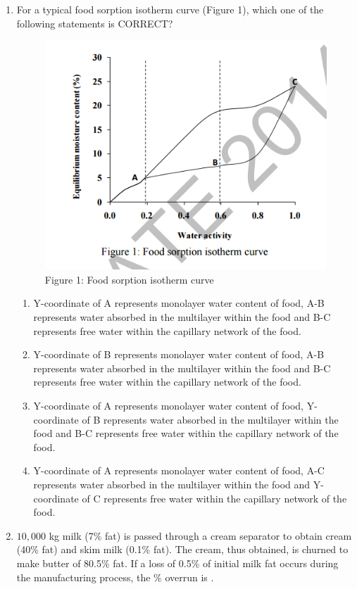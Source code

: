 \documentclass[a4paper,10pt]{article}
\begin{document}
\begin{enumerate}
    \item For a typical food sorption isotherm curve (Figure 1), which one of the following statements is CORRECT?
    \begin{figure}[H] \centering \includegraphics[width=0.6\columnwidth]{q20_food.png} \caption*{Figure 1: Food sorption isotherm curve} \label{fig:q20_food} \end{figure}
    
    \hfill{}
    \begin{enumerate}[label=\Alph*)]
        \item Y-coordinate of A represents monolayer water content of food, A-B represents water absorbed in the multilayer within the food and B-C represents free water within the capillary network of the food.
        \item Y-coordinate of B represents monolayer water content of food, A-B represents water absorbed in the multilayer within the food and B-C represents free water within the capillary network of the food.
        \item Y-coordinate of A represents monolayer water content of food, Y-coordinate of B represents water absorbed in the multilayer within the food and B-C represents free water within the capillary network of the food.
        \item Y-coordinate of A represents monolayer water content of food, A-C represents water absorbed in the multilayer within the food and Y-coordinate of C represents free water within the capillary network of the food.
    \end{enumerate}
    
    \item $10,000$ kg milk (7\% fat) is passed through a cream separator to obtain cream (40\% fat) and skim milk (0.1\% fat). The cream, thus obtained, is churned to make butter of 80.5\% fat. If a loss of 0.5\% of initial milk fat occurs during the manufacturing process, the \% overrun is \underline{\hspace{2cm}}.
    

\end{enumerate}
\end{document}
